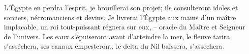 L’Égypte en perdra l’esprit, je brouillerai son projet;
	ils consulteront idoles et sorciers, nécromanciens et devins.
Je livrerai l’Égypte aux mains d’un maître implacable,
	un roi tout-puissant régnera sur eux,
	– oracle du Maître et Seigneur de l’univers.
Les eaux s’épuiseront avant d’atteindre la mer,
	le fleuve tarira, s’asséchera, ses canaux empesteront,
	le delta du Nil baissera, s’asséchera.
